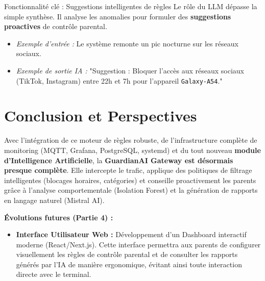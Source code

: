 \documentclass[11pt,a4paper]{article}
\begin{document}
\begin{choixcadre}{Fonctionnalité clé : Suggestions intelligentes de règles}
Le rôle du LLM dépasse la simple synthèse. Il analyse les anomalies pour formuler des \textbf{suggestions proactives} de contrôle parental. 
\begin{itemize}
    \item \textit{Exemple d'entrée :} Le système remonte un pic nocturne sur les réseaux sociaux.
    \item \textit{Exemple de sortie IA :} "Suggestion : Bloquer l'accès aux réseaux sociaux (TikTok, Instagram) entre 22h et 7h pour l'appareil \texttt{Galaxy-A54}."
\end{itemize}
\end{choixcadre}

\section*{Conclusion et Perspectives}

Avec l'intégration de ce moteur de règles robuste, de l'infrastructure complète de monitoring (MQTT, Grafana, PostgreSQL, systemd) et du tout nouveau \textbf{module d'Intelligence Artificielle}, la \textbf{GuardianAI Gateway est désormais presque complète}. Elle intercepte le trafic, applique des politiques de filtrage intelligentes (blocages horaires, catégories) et conseille proactivement les parents grâce à l'analyse comportementale (Isolation Forest) et la génération de rapports en langage naturel (Mistral AI).

\textbf{Évolutions futures (Partie 4) :}
\begin{itemize}
  \item \textbf{Interface Utilisateur Web :} Développement d'un Dashboard interactif moderne (React/Next.js). Cette interface permettra aux parents de configurer visuellement les règles de contrôle parental et de consulter les rapports générés par l'IA de manière ergonomique, évitant ainsi toute interaction directe avec le terminal.
\end{itemize}
\end{document}
